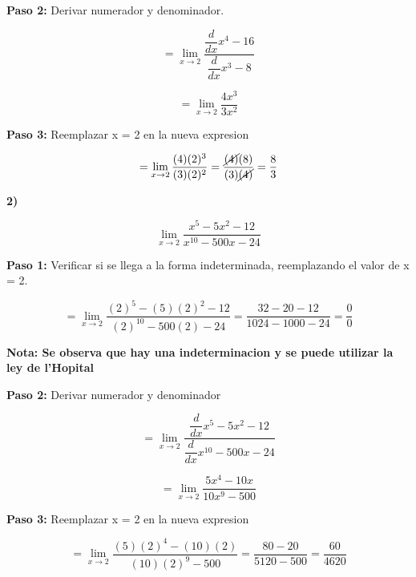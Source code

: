 \documentclass[12pt,a4paper]{article}
\begin{document}
\vspace{0.5cm}

\textbf{Paso 2:}
\vspace{0.2cm}
Derivar numerador y denominador.

\[
= \lim_{x \to 2} \frac{\dfrac{d}{dx} x^4 -16}{\dfrac{d}{dx} x^3 - 8}
\]

\[
= \lim_{x \to 2} \frac{4x^3}{3x^2}
\]

\vspace{0.2cm}



\textbf{Paso 3:}
\vspace{0.2cm}
Reemplazar x = 2 en la nueva expresion

\[
= \lim_{x \to 2} \frac{(4)(2)^3}{(3)(2)^2}= \frac{\cancel{(4)}(8)}{(3)\cancel{(4)}}= \frac{8}{3}
\]


\newpage

\textbf{2)}

\[
\lim_{x \to 2} \frac{x^5 - 5x^2 - 12}{x^{10} - 500x - 24} 
\]

\vspace{0.2cm}

\textbf{Paso 1:}
\vspace{0.2cm}
Verificar si se llega a la forma indeterminada, reemplazando el valor de x = 2.

\[
= \lim_{x \to 2} \frac{(2)^5 - (5)(2)^2 - 12}{(2)^{10} - 500(2) - 24}= \frac{32 - 20 - 12}{1024 - 1000 -24}= \frac{0}{0}
\]

\vspace{0.2cm}

\textbf{Nota: Se observa que hay una indeterminacion y se puede utilizar la ley de l'Hopital }

\vspace{0.5cm}

\textbf{Paso 2:}
\vspace{0.2cm}
Derivar numerador y denominador

\[
= \lim_{x \to 2} \frac{\dfrac{d}{dx} x^5 - 5x^2 - 12}{\dfrac{d}{dx} x^{10} - 500x - 24}
\]

\[
= \lim_{x \to 2} \frac{5x^4 - 10x}{10x^9 - 500}
\]

\vspace{0.2cm}



\textbf{Paso 3:}
\vspace{0.2cm}
Reemplazar x = 2 en la nueva expresion

\[
= \lim_{x \to 2} \frac{(5)(2)^4 - (10)(2)}{(10)(2)^9 - 500}= \frac{80 - 20}{5120 - 500}= \frac{60}{4620}
\]
\end{document}
